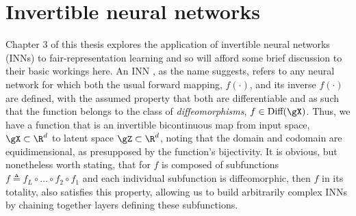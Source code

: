 \section{Invertible neural networks}\label{sec:inns}
Chapter 3 of this thesis explores the application of invertible neural networks (INNs) to
fair-representation learning and so will afford some brief discussion to their basic workings here.
%
%
An INN \citep{kobyzev2020normalizing}, as the name suggests, refers to any neural network for which
both the usual forward mapping, \(f(\cdot)\), and its inverse \(f(\cdot)\) are defined, with the
assumed property that both are differentiable and as such that the function belongs to the class of
\emph{diffeomorphisms}, \(f \in \text{Diff}(\gX)\). 
%
Thus, we have a function that is an invertible bicontinuous map from input space, \(\gX \subset
\R^d \) to latent space \(\gZ \subset \R^d \), noting that the domain and codomain are
equidimensional, as presupposed by the function's bijectivity.
%
It is obvious, but nonetheless worth stating, that for \(f\) is composed of subfunctions \(f
\triangleq f_L \circ \dots \circ f_2 \circ f_1\) and each individual subfunction is diffeomorphic,
then \(f\) in its totality, also satisfies this property, allowing us to build arbitrarily complex
INNs by chaining together layers defining these subfunctions.
%

